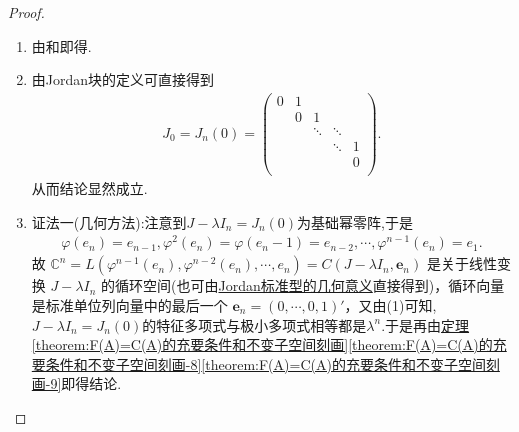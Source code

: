 \documentclass[../../main.tex]{subfiles}%
\begin{document}
\begin{proof}
\begin{enumerate}[(1)]
\item 由和即得.

\item 由Jordan块的定义可直接得到
\begin{align*}
J_0=J_n(0)=\left( \begin{matrix}
0&		1&		&		&		\\
&		0&		1&		&		\\
&		&		\ddots&		\ddots&		\\
&		&		&		\ddots&		1\\
&		&		&		&		0\\
\end{matrix} \right) .
\end{align*}
从而结论显然成立.

\item {\color{blue}证法一(几何方法):}注意到$J-\lambda I_n=J_n(0)$为基础幂零阵,于是
\begin{align*}
\varphi(e_n)=e_{n-1},\varphi^2(e_n)=\varphi(e_n-1)=e_{n-2},\cdots,\varphi^{n-1}(e_n)=e_1.
\end{align*}
故
$\mathbb{C}^n =L(\varphi^{n-1}(e_n),\varphi^{n-2}(e_n),\cdots,e_n)=C(J - \lambda I_n, \boldsymbol{e}_n)$ 是关于线性变换 $J - \lambda I_n$ 的循环空间(也可由\hyperref[theorem:Jordan标准型的几何意义]{Jordan标准型的几何意义}直接得到)，循环向量是标准单位列向量中的最后一个 $\boldsymbol{e}_n = (0, \cdots, 0, 1)'$，又由(1)可知,$J-\lambda I_n=J_n(0)$的特征多项式与极小多项式相等都是$\lambda^n$.于是再由\hyperref[theorem:F(A)=C(A)的充要条件和不变子空间刻画]{定理\ref{theorem:F(A)=C(A)的充要条件和不变子空间刻画}\ref{theorem:F(A)=C(A)的充要条件和不变子空间刻画-8}\ref{theorem:F(A)=C(A)的充要条件和不变子空间刻画-9}}即得结论.


\end{enumerate}
\end{proof}
\end{document}

